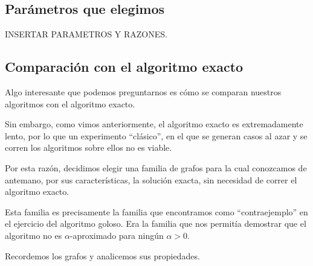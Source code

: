 
\subsection{Parámetros que elegimos}

INSERTAR PARAMETROS Y RAZONES.

\subsection{Comparación con el algoritmo exacto}

Algo interesante que podemos preguntarnos es cómo se comparan nuestros algoritmos con el algoritmo exacto.

Sin embargo, como vimos anteriormente, el algoritmo exacto es extremadamente lento, por lo que un experimento ``clásico'', en el que se generan casos al azar y se corren los algoritmos sobre ellos no es viable.

Por esta razón, decidimos elegir una familia de grafos para la cual conozcamos de antemano, por sus características, la solución exacta, sin necesidad de correr el algoritmo exacto. 

Esta familia es precisamente la familia que encontramos como ``contraejemplo'' en el ejercicio del algoritmo goloso. Era la familia que nos permitía demostrar que el algoritmo no es $\alpha$-aproximado para ningún $\alpha > 0$. 

Recordemos los grafos y analicemos sus propiedades.



